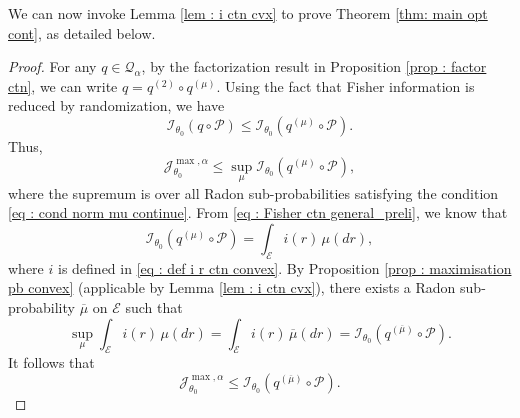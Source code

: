 \documentclass[a4paper, 11pt]{article}
\theoremstyle{definition}
\newcommand{\cE}{{\mathcal{E}}}
\newcommand{\cI}{{\mathcal{I}}}
\newcommand{\cJ}{{\mathcal{J}}}
\newcommand{\cP}{{\mathcal{P}}}
\newcommand{\cQ}{{\mathcal{Q}}}
\begin{document}
{We can now invoke Lemma \ref{lem : i ctn cvx} to prove Theorem \ref{thm: main opt cont}, as detailed below.


\begin{proof}
For any \( q \in \cQ_\alpha \), by the factorization result in Proposition \ref{prop : factor ctn}, we can write \( q = q^{(2)} \circ q^{(\mu)} \). Using the fact that Fisher information is reduced by randomization, we have
\[
\cI_{\theta_0}(q \circ \cP) \le \cI_{\theta_0}(q^{(\mu)} \circ \cP).
\]
Thus,
\[
\cJ^{\max,\alpha}_{\theta_0} \le \sup_{\mu} \cI_{\theta_0}(q^{(\mu)} \circ \cP),
\]
where the supremum is over all Radon sub-probabilities satisfying the condition \eqref{eq : cond norm mu continue}. 
From \eqref{eq : Fisher ctn general_preli}, we know that
\[
\cI_{\theta_0}(q^{(\mu)} \circ \cP) = \int_\cE i(r) \, \mu(dr),
\]
where \( i \) is defined in \eqref{eq : def i r ctn convex}. By Proposition \ref{prop : maximisation pb convex} (applicable by Lemma \ref{lem : i ctn cvx}), there exists a Radon sub-probability \( \overline{\mu} \) on \( \cE \) such that
\[
\sup_{\mu} \int_\cE i(r) \, \mu(dr) = \int_\cE i(r) \, \overline{\mu}(dr) = \cI_{\theta_0}(q^{(\overline{\mu})} \circ \cP).
\]
It follows that
\[
\cJ^{\max,\alpha}_{\theta_0} \le \cI_{\theta_0}(q^{(\overline{\mu})} \circ \cP).
\]


\end{proof}}
\end{document}
